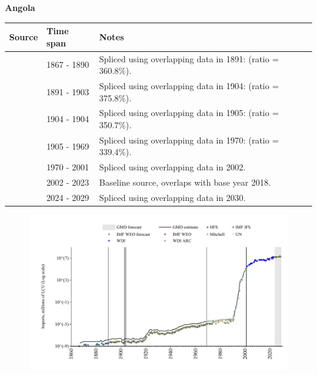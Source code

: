 \documentclass[12pt,a4paper,landscape]{article}
\begin{document}
\begin{adjustbox}{max totalsize={\paperwidth}{\paperheight},center}
\begin{minipage}[t][\textheight][t]{\textwidth}
\vspace*{0.5cm}
{}
\begin{center}
{\Large\bfseries Angola}
\end{center}
\vspace{0.5cm}
\begin{table}[H]
\centering
\small
\begin{tabular}{|l|l|l|}
\hline
\textbf{Source} & \textbf{Time span} & \textbf{Notes} \\
\hline
\rowcolor{white}\cite{HFS}& 1867 - 1890 &Spliced using overlapping data in 1891: (ratio = 360.8\%).\\
\rowcolor{lightgray}\cite{Mitchell}& 1891 - 1903 &Spliced using overlapping data in 1904: (ratio = 375.8\%).\\
\rowcolor{white}\cite{HFS}& 1904 - 1904 &Spliced using overlapping data in 1905: (ratio = 350.7\%).\\
\rowcolor{lightgray}\cite{Mitchell}& 1905 - 1969 &Spliced using overlapping data in 1970: (ratio = 339.4\%).\\
\rowcolor{white}\cite{UN}& 1970 - 2001 &Spliced using overlapping data in 2002.\\
\rowcolor{lightgray}\cite{WDI}& 2002 - 2023 &Baseline source, overlaps with base year 2018.\\
\rowcolor{white}\cite{IMF_WEO_forecast}& 2024 - 2029 &Spliced using overlapping data in 2030.\\
\hline
\end{tabular}
\end{table}
\begin{figure}[H]
\centering
\includegraphics[width=\textwidth,height=0.6\textheight,keepaspectratio]{graphs/AGO_imports.pdf}
\end{figure}
\end{minipage}
\end{adjustbox}
\end{document}
